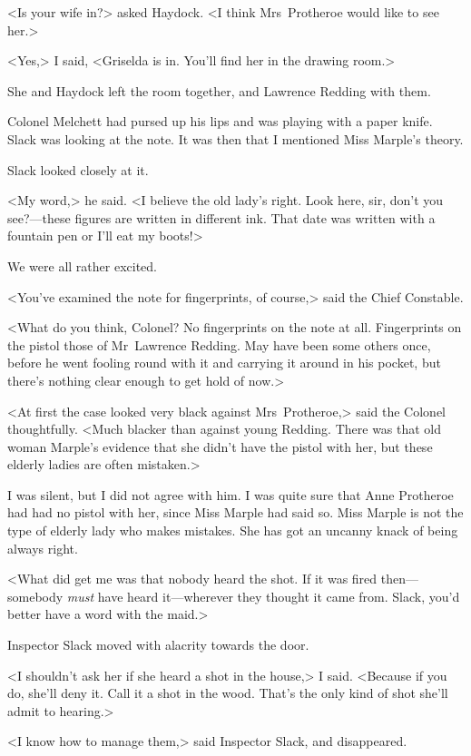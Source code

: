 <Is your wife in?> asked Haydock. <I think Mrs~Protheroe would like to see her.>

<Yes,> I said, <Griselda is in. You'll find her in the drawing room.>

She and Haydock left the room together, and Lawrence Redding with them.

Colonel Melchett had pursed up his lips and was playing with a paper knife. Slack was looking at the note. It was then that I mentioned Miss Marple's theory.

Slack looked closely at it.

<My word,> he said. <I believe the old lady's right. Look here, sir, don't you see?—these figures are written in different ink. That date was written with a fountain pen or I'll eat my boots!>

We were all rather excited.

<You've examined the note for fingerprints, of course,> said the Chief Constable.

<What do you think, Colonel? No fingerprints on the note at all. Fingerprints on the pistol those of Mr~Lawrence Redding. May have been some others once, before he went fooling round with it and carrying it around in his pocket, but there's nothing clear enough to get hold of now.>

<At first the case looked very black against Mrs~Protheroe,> said the Colonel thoughtfully. <Much blacker than against young Redding. There was that old woman Marple's evidence that she didn't have the pistol with her, but these elderly ladies are often mistaken.>

I was silent, but I did not agree with him. I was quite sure that Anne Protheroe had had no pistol with her, since Miss Marple had said so. Miss Marple is not the type of elderly lady who makes mistakes. She has got an uncanny knack of being always right.

<What did get me was that nobody heard the shot. If it was fired then—somebody \emph{must} have heard it—wherever they thought it came from. Slack, you'd better have a word with the maid.>

Inspector Slack moved with alacrity towards the door.

<I shouldn't ask her if she heard a shot in the house,> I said. <Because if you do, she'll deny it. Call it a shot in the wood. That's the only kind of shot she'll admit to hearing.>

<I know how to manage them,> said Inspector Slack, and disappeared.

